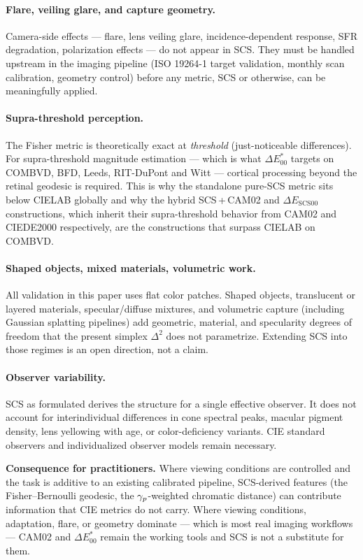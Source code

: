 \documentclass[12pt,a4paper]{article}
\begin{document}
\paragraph{Flare, veiling glare, and capture geometry.}
Camera-side effects --- flare, lens veiling glare, incidence-dependent
response, SFR degradation, polarization effects --- do not appear in
SCS. They must be handled upstream in the imaging pipeline (ISO
19264-1 target validation, monthly scan calibration, geometry control)
before any metric, SCS or otherwise, can be meaningfully applied.

\paragraph{Supra-threshold perception.}
The Fisher metric is theoretically exact at \emph{threshold}
(just-noticeable differences). For supra-threshold magnitude estimation
--- which is what $\Delta E^*_{00}$ targets on COMBVD, BFD, Leeds,
RIT-DuPont and Witt --- cortical processing beyond the retinal geodesic
is required. This is why the standalone pure-SCS metric sits below
CIELAB globally and why the hybrid SCS\,+\,CAM02 and
$\Delta E_{\mathrm{SCS00}}$ constructions, which inherit their
supra-threshold behavior from CAM02 and CIEDE2000 respectively, are the
constructions that surpass CIELAB on COMBVD.

\paragraph{Shaped objects, mixed materials, volumetric work.}
All validation in this paper uses flat color patches. Shaped objects,
translucent or layered materials, specular/diffuse mixtures, and
volumetric capture (including Gaussian splatting pipelines) add
geometric, material, and specularity degrees of freedom that the
present simplex $\Delta^2$ does not parametrize. Extending SCS into
those regimes is an open direction, not a claim.

\paragraph{Observer variability.}
SCS as formulated derives the structure for a single effective
observer. It does not account for interindividual differences
in cone spectral peaks, macular pigment density, lens yellowing with
age, or color-deficiency variants. CIE standard observers and
individualized observer models remain necessary.

\medskip\noindent\textbf{Consequence for practitioners.} Where viewing
conditions are controlled and the task is additive to an existing
calibrated pipeline, SCS-derived features (the Fisher--Bernoulli
geodesic, the $\gamma_{p}$-weighted chromatic distance) can contribute
information that CIE metrics do not carry. Where viewing conditions,
adaptation, flare, or geometry dominate --- which is most real imaging
workflows --- CAM02 and $\Delta E^*_{00}$ remain the working tools and
SCS is not a substitute for them.
\end{document}
